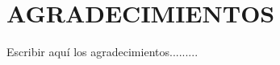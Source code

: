 \chapter*{AGRADECIMIENTOS}
\renewcommand{\thepage}{\roman{page}}
Escribir aqu\'i los agradecimientos.........